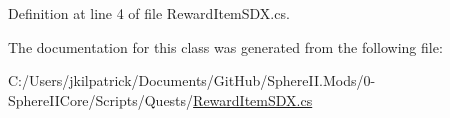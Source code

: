 Definition at line 4 of file Reward\+Item\+S\+D\+X.\+cs.



The documentation for this class was generated from the following file\+:\begin{DoxyCompactItemize}
\item 
C\+:/\+Users/jkilpatrick/\+Documents/\+Git\+Hub/\+Sphere\+I\+I.\+Mods/0-\/\+Sphere\+I\+I\+Core/\+Scripts/\+Quests/\mbox{\hyperlink{_reward_item_s_d_x_8cs}{Reward\+Item\+S\+D\+X.\+cs}}\end{DoxyCompactItemize}
